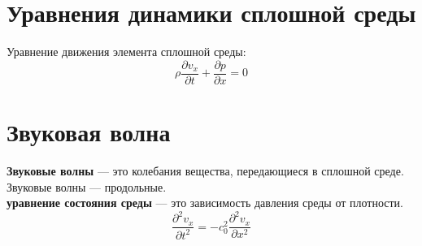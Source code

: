 \documentclass[fleqn,a4paper,12pt,titlepage,finall]{article}
\begin{document}
\section{Уравнения динамики сплошной среды}
Уравнение движения элемента сплошной среды:
\[\rho\frac{\partial v_x}{\partial t} + \frac{\partial p}{\partial x} = 0\]
\section{Звуковая волна}
{\bf Звуковые волны} --- это колебания вещества, передающиеся в сплошной среде.
Звуковые волны --- продольные. \\
{\bf уравнение состояния среды} --- это зависимость давления среды от плотности.
\[\frac{\partial^2v_x}{\partial t^2} = -c_0^2\frac{\partial^2v_x}{\partial
x^2}\]
\end{document}

